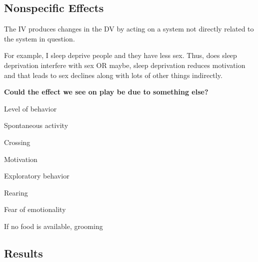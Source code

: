 \subsection{Nonspecific Effects}

\begin{coloredlist}
    \item The IV produces changes in the DV by acting on a system not directly related to the system in question.
    \item For example, I sleep deprive people and they have less sex. Thus, does sleep deprivation interfere with sex OR maybe, sleep deprivation reduces motivation and that leads to sex declines along with lots of other things indirectly.
    \item \textbf{Could the effect we see on play be due to something else?}
    \begin{coloredlist}
        \item Level of behavior
        \begin{coloredlist}
            \item Spontaneous activity
            \item Crossing
        \end{coloredlist}
        \item Motivation
        \begin{coloredlist}
            \item Exploratory behavior
            \item Rearing
        \end{coloredlist}
        \item Fear of emotionality
        \begin{coloredlist}
            \item If no food is available, grooming
        \end{coloredlist}
    \end{coloredlist}
\end{coloredlist}

\subsection{Results}

